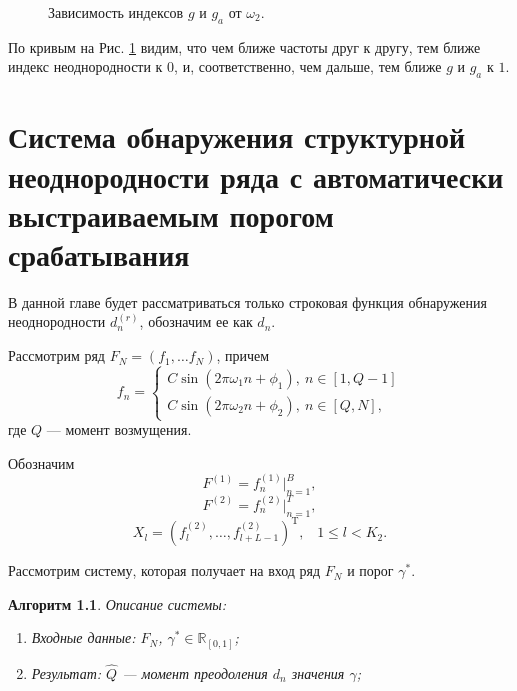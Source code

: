 \documentclass[specialist, substylefile = spbu.rtx,
			   subf, href, 12pt]{disser}
\newtheorem{algorithm}{Алгоритм}
\begin{document}
\begin{figure}[!hhh]
	\caption{Зависимость индексов $ g $ и $ g_a $ от $ \omega_2 $.}
	\label{pic:g_c_vs_g_a_from_w_2}
\end{figure}

По кривым на Рис. \ref{pic:g_c_vs_g_a_from_w_2} видим, что чем ближе частоты друг к другу, тем ближе индекс неоднородности к $ 0 $, и, соответственно, чем дальше, тем ближе $ g $ и $ g_a $ к $ 1 $.


\newpage
\chapter{Система обнаружения структурной неоднородности ряда с автоматически выстраиваемым порогом срабатывания} \label{sec:ch_5}

В данной главе будет рассматриваться только строковая функция обнаружения неоднородности $ d_n^{(r)} $, обозначим ее как $ d_n $.


Рассмотрим ряд $ F_N = (f_1, \dots f_{N}) $, причем  
\begin{equation*} 
	f_n = 
	\begin{cases} 
		C\sin(2\pi\omega_1 n + \phi_1),\ n \in [1, Q-1] \\ 
		C\sin(2\pi\omega_2 n + \phi_2),\ n \in [Q, N], 
	\end{cases} 
\end{equation*} 
где $ Q $ --- момент возмущения. 

Обозначим
$$ F^{(1)} = f_n^{(1)}|_{n=1}^{B}, $$
$$ F^{(2)} = f_n^{(2)}|_{n=1}^{T}, $$
$$ X_l = (f_{l}^{(2)}, \dotsc, f_{l+L-1}^{(2)})^\mathrm{T}, \;\;\; 1 \leq l < K_2. $$

Рассмотрим систему, которая получает на вход ряд $ F_N $ и порог $ \gamma^* $.

\begin{algorithm}\label{algo:system_works}
	Описание системы:
	\begin{enumerate}
		\item Входные данные: $ F_N $, $ \gamma^* \in \mathbb{R}_{[0, 1]} $;
		\item Результат: $\hat{Q}$ --- момент преодоления $ d_n $ значения $ \gamma $;
		\end{enumerate}
\end{algorithm}
\end{document}
